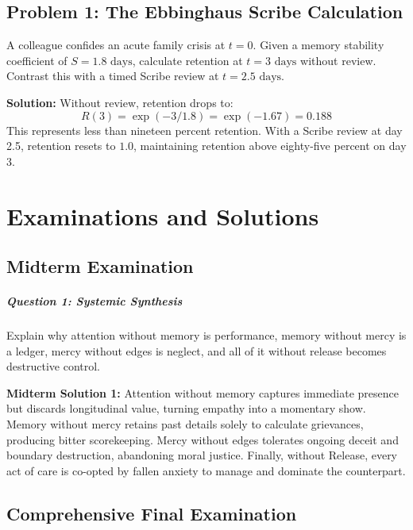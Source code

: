 \documentclass[11pt]{report}
\begin{document}
\section{Problem 1: The Ebbinghaus Scribe Calculation}
A colleague confides an acute family crisis at $t = 0$. Given a memory stability coefficient of $S = 1.8 \text{ days}$, calculate retention at $t = 3 \text{ days}$ without review. Contrast this with a timed Scribe review at $t = 2.5 \text{ days}$.

\begin{blackboard}
\textbf{Solution:}
Without review, retention drops to:
\[
R(3) = \exp(-3 / 1.8) = \exp(-1.67) = 0.188
\]
This represents less than nineteen percent retention. With a Scribe review at day 2.5, retention resets to $1.0$, maintaining retention above eighty-five percent on day 3.
\end{blackboard}

\chapter{Examinations and Solutions}

\section{Midterm Examination}

\paragraph{Question 1: Systemic Synthesis}
Explain why attention without memory is performance, memory without mercy is a ledger, mercy without edges is neglect, and all of it without release becomes destructive control.

\begin{blackboard}
\textbf{Midterm Solution 1:}
Attention without memory captures immediate presence but discards longitudinal value, turning empathy into a momentary show. Memory without mercy retains past details solely to calculate grievances, producing bitter scorekeeping. Mercy without edges tolerates ongoing deceit and boundary destruction, abandoning moral justice. Finally, without Release, every act of care is co-opted by fallen anxiety to manage and dominate the counterpart.
\end{blackboard}

\section{Comprehensive Final Examination}
\end{document}
